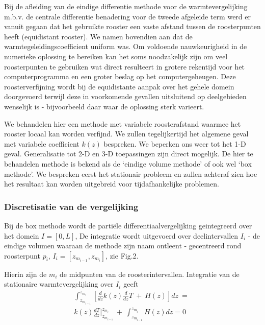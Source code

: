 Bij de afleiding van de eindige differentie methode voor de 
warmtevergelijking m.b.v. de centrale differentie benadering voor
de tweede afgeleide term werd er vanuit gegaan dat het gebruikte rooster
een vaste afstand tussen de roosterpunten heeft (equidistant rooster). 
We namen bovendien aan dat de warmtegeleidingscoefficient uniform was.
Om voldoende nauwkeurigheid in de numerieke oplossing te bereiken kan
het soms noodzakelijk zijn om veel roosterpunten te gebruiken wat direct
resulteert in grotere rekentijd voor het computerprogramma en een 
groter beslag op het computergeheugen.
Deze roosterverfijning wordt bij de equidistante aanpak over het gehele
domein doorgevoerd terwijl deze in voorkomende gevallen uitsluitend op
deelgebieden wenselijk is - bijvoorbeeld daar waar de oplossing 
sterk varieert.

We behandelen hier een methode met variabele roosterafstand waarmee 
het rooster locaal kan worden verfijnd.
We zullen tegelijkertijd het algemene geval met variabele coefficient 
$k(z)$ bespreken.
We beperken ons weer tot het 1-D geval. Generalisatie tot 2-D en 3-D
toepassingen zijn direct mogelijk.
De hier te behandelen methode is bekend als de 
`eindige volume methode' of ook wel `box methode'.
We bespreken eerst het stationair probleem en zullen achteraf zien
hoe het resultaat kan worden uitgebreid voor tijdafhankelijke
problemen.

\subsubsection{Discretisatie van de vergelijking}
Bij de box methode wordt de parti\"{e}le differentiaalvergelijking
geintegreerd over het domein $I = [0,L]$,
De integratie wordt uitgevoerd over deelintervallen $I_i$
- de eindige volumen waaraan de methode zijn naam ontleent -
gecentreerd rond roosterpunt $p_i$,
$I_i = [z_{m_{i-1}} , z_{m_i} ]$,
zie Fig.2.


Hierin zijn de $m_i$ de midpunten van de roosterintervallen.
Integratie van de stationaire warmtevergelijking over $I_i$ geeft
\begin{eqnarray}
\int_{z_{m_{i-1}}} ^{z_{m_i}}
    \left [
          \frac{d}{dz} k(z) 
          \frac{d}{dz} T
          \ +\ 
          H(z)
    \right ]
dz
\ =\ \nonumber \\
k(z) \frac {dT}{ dz} |_{z_{m_{i-1}}} ^{z_{m_i}}
\ +\ 
\int_{z_{m_{i-1}}} ^{z_{m_i}}
          H(z)
dz
= 0
\end{eqnarray}

